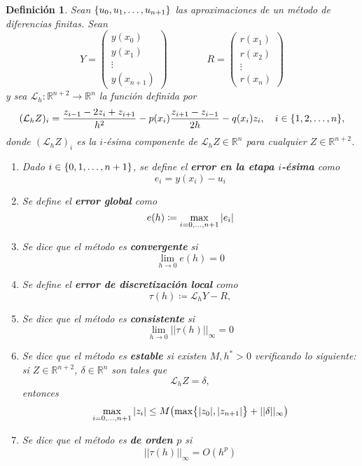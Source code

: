 \documentclass[11pt]{report}
\theoremstyle{mytheorem}
\theoremstyle{mydefinition}
\newtheorem{definition}{Definición}
\theoremstyle{myexample}
\newenvironment{cdefinition} %
  {\begin{mdframed}[
        linewidth=3pt,
        linecolor=c1,
        bottomline=false,
        topline=false,
        rightline=false,
        innerrightmargin=0pt,
        innertopmargin=0pt,
        innerbottommargin=0pt,
        innerleftmargin=1em, %
        skipabove=\baselineskip]
    \begin{definition}}
  {\end{definition}\end{mdframed}}
\newcommand{\R}{\mathbb R}
\newcommand{\mybf}[1]{\boldmath\textbf{\color{c1}#1}\unboldmath}
\begin{document}
\begin{cdefinition}
Sean $\{u_0,u_1,\mathellipsis,u_{n+1}\}$ las aproximaciones de un método de diferencias finitas. Sean
\[Y = \left(\begin{array}{c}
        y(x_0) \\
        y(x_1) \\
        \vdots \\
        y(x_{n+1})
    \end{array}\right) \qquad \qquad R = \left(\begin{array}{c}
        r(x_1) \\
        r(x_2) \\
        \vdots \\
        r(x_{n})
    \end{array}\right)\]
y sea $\mathcal{L}_h \colon \R^{n+2} \to \R^n$ la función definida por 
\[(\mathcal{L}_hZ)_i = \frac{z_{i-1}-2z_i+z_{i+1}}{h^2}-p(x_i)\frac{z_{i+1}-z_{i-1}}{2h}-q(x_i)z_i, \quad i \in \{1,2,\mathellipsis,n\},\]
donde $(\mathcal{L}_hZ)_i$ es la $i$-ésima componente de $\mathcal{L}_hZ \in \R^n$ para cualquier $Z \in \R^{n+2}$.
\begin{enumerate}
    \item Dado $i \in \{0,1,\mathellipsis,n+1\}$, se define el \mybf{error en la etapa $i$-ésima} como
    \[e_i = y(x_i)-u_i\]
    \item Se define el \mybf{error global} como
    \[e(h) \coloneqq \max_{i=0,\mathellipsis,n+1} |e_i|\]
    \item Se dice que el método es \mybf{convergente} si
    \[\lim_{h \to 0} e(h)=0\]
    \item Se define el \mybf{error de discretización local} como
    \[\tau(h)\coloneqq \mathcal{L}_hY - R,\]
    
    \item Se dice que el método es \mybf{consistente} si
    \[\lim_{h \to 0} ||\tau(h)||_\infty = 0\]
    \item Se dice que el método es \mybf{estable} si existen $M,h^*>0$ verificando lo siguiente: si $Z \in \R^{n+2}$, $\delta \in \R^n$ son tales que
    \[\mathcal{L}_hZ = \delta,\]
    entonces
    \[\max_{i=0,\mathellipsis,n+1} |z_i| \leq M\bigl(\max\bigl\{|z_0|,|z_{n+1}|\bigr\}+||\delta||_\infty\bigr)\]
    \item Se dice que el método es \mybf{de orden $p$} si
    \[||\tau(h)||_\infty = O(h^p)\]
\end{enumerate}
\end{cdefinition}
\end{document}
